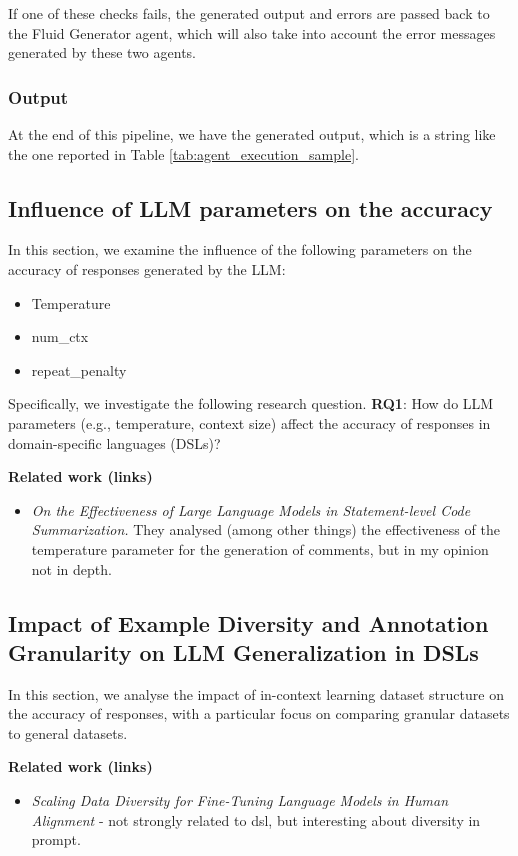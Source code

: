 If one of these checks fails, the generated output and errors are passed back to the Fluid Generator agent, which will also take into account the error messages generated by these two agents.

\subsubsection{Output}

At the end of this pipeline, we have the generated output, which is a string like the one reported in Table \ref{tab:agent_execution_sample}.

\subsection{Influence of LLM parameters on the accuracy}
In this section, we examine the influence of the following parameters on the accuracy of responses generated by the LLM:

\begin{itemize}
    \item Temperature
    \item num\_ctx
    \item repeat\_penalty
\end{itemize}

Specifically, we investigate the following research question. \textbf{RQ1}: How do LLM parameters (e.g., temperature, context size) affect the accuracy of responses in domain-specific languages (DSLs)?

\textbf{Related work (links)}
\begin{itemize}
    \item \textit{On the Effectiveness of Large Language Models in Statement-level Code Summarization.} They analysed (among other things) the effectiveness of the temperature parameter for the generation of comments, but in my opinion not in depth.
\end{itemize}


\subsection{Impact of Example Diversity and Annotation Granularity on LLM Generalization in DSLs}
In this section, we analyse the impact of in-context learning dataset structure on the accuracy of responses, with a particular focus on comparing granular datasets to general datasets.

\textbf{Related work (links)}
\begin{itemize}
    \item \textit{Scaling Data Diversity for Fine-Tuning Language Models in Human Alignment} - not strongly related to dsl, but interesting about diversity in prompt.
\end{itemize}

